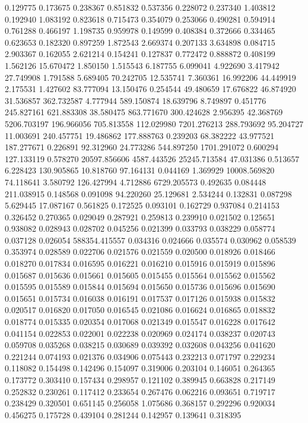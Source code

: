 0.129775
0.173675
0.238367
0.851832
0.537356
0.228072
0.237340
1.403812
0.192940
1.083192
0.823618
0.715473
0.354079
0.253066
0.490281
0.594914
0.761288
0.466197
1.198735
0.959978
0.149599
0.408384
0.372666
0.334465
0.623653
0.182320
0.897259
1.872543
2.669374
0.207133
3.634898
0.084715
2.903367
0.162055
2.621214
0.154241
0.127837
0.772472
0.888872
0.408199
1.562126
15.670472
1.850150
1.515543
6.187755
6.099041
4.922690
3.417942
27.749908
1.791588
5.689405
70.242705
12.535741
7.360361
16.992206
44.449919
2.175531
1.427602
83.777094
13.150476
0.254544
49.480659
17.676822
46.874920
31.536857
362.732587
4.777944
589.150874
18.639796
8.749897
0.451776
245.827161
621.883308
38.580475
863.771670
300.424628
2.956395
42.368769
5206.703197
196.966056
705.813558
112.029980
7201.276213
288.793692
95.204727
11.003691
240.457751
19.486862
177.888763
0.239203
68.382222
43.977521
187.277671
0.226891
92.312960
24.773286
544.897250
1701.291072
0.600294
127.133119
0.578270
20597.856606
4587.443526
25245.713584
47.031386
0.513657
6.228423
130.905865
10.818760
97.164131
0.044169
1.369929
10008.569820
74.118641
3.580792
126.427994
4.712886
6729.205573
0.492635
0.084448
211.038915
0.148568
0.091098
94.220260
25.129681
2.534244
0.132831
0.087298
5.629445
17.087167
0.561825
0.172525
0.093101
0.162729
0.937084
0.214153
0.326452
0.270365
0.029049
0.287921
0.259813
0.239910
0.021502
0.125651
0.938082
0.028943
0.028702
0.045256
0.021399
0.033793
0.038229
0.058774
0.037128
0.026054
588354.415557
0.034316
0.024666
0.035574
0.030962
0.058539
0.353974
0.028589
0.022706
0.021576
0.021559
0.020500
0.018926
0.018466
0.018270
0.017834
0.016595
0.016221
0.016210
0.015916
0.015919
0.015896
0.015687
0.015636
0.015661
0.015605
0.015455
0.015564
0.015562
0.015562
0.015595
0.015589
0.015844
0.015694
0.015650
0.015736
0.015696
0.015690
0.015651
0.015734
0.016038
0.016191
0.017537
0.017126
0.015938
0.015832
0.020517
0.016820
0.017050
0.016545
0.021086
0.016624
0.016865
0.018832
0.018774
0.015335
0.020354
0.017068
0.021349
0.015547
0.016228
0.017642
0.041154
0.022853
0.022001
0.022238
0.020969
0.024174
0.038237
0.020743
0.059708
0.035268
0.038215
0.030689
0.039392
0.032608
0.043256
0.041620
0.221244
0.074193
0.021376
0.034906
0.075443
0.232213
0.071797
0.229234
0.118082
0.154498
0.142496
0.154097
0.319006
0.203104
0.146051
0.264365
0.173772
0.303410
0.157434
0.298957
0.121102
0.389945
0.663828
0.217149
0.252832
0.230261
0.117412
0.233654
0.267476
0.062216
0.093651
0.719717
0.238429
0.320501
0.651145
0.256058
1.075686
0.368157
0.292296
0.920034
0.456275
0.175728
0.439104
0.281244
0.142957
0.139641
0.318395
